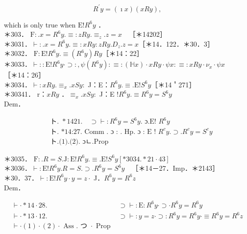 \documentclass[10pt]{article}
\begin{document}
$$
R^{\prime} y=(\imath x)(x R y),
$$

which is only true when $\mathrm{E}!R^{6} y$ ．\\
＊303． $\mathrm{F}: . x=R^{6} y . \equiv: z R y . \equiv_{z} . z=x \quad$［＊14202］\\
＊3031．$\vdash: . x=R^{6} y . \equiv: x R y: z R y . D_{z} . z=x$［＊14．122．＊30．3］\\
＊3032． $\mathrm{F}: \mathrm{E}!R^{6} y . \equiv\left(R^{6} y\right) R y$［＊14：22］\\
＊3033．$\vdash:: \mathrm{E}!R^{6} y \cdot \supset:, \psi\left(R^{6} y\right): \equiv:(\mathbb{H} x) \cdot x R y \cdot \psi x: \equiv: x R y \cdot \nu_{x} \cdot \psi x$\\
［＊14：26］\\
＊3034．$\vdash: x R y . \equiv_{x} . x S y:$ J：E：$R^{6} y . \equiv . \mathrm{E}!S^{6} y$［＊14＇271］\\
＊30341． r：$x R y$ ．$\equiv_{x} . x S y:$ J：E $!R^{6} y . \equiv R^{6} y=S^{6} y$\\
Dem．


\begin{align*}
& \text { ト. } * 1421 . \quad \supset \vdash: R^{6} y=S^{6} y . \text { ɔ.E! } R^{6} y  \tag{1}\\
& \text { ト. *14:27. Comm . ɔ : . Hp. ɔ : E ! } R^{c} y . \supset . R^{c} y=S^{c} y  \tag{2}\\
& \text { ト.(1).(2). ɔㄴ.Prop }
\end{align*}


＊3035． $\mathrm{F}: . R=S . \mathrm{J}: \mathrm{E}!R^{6} y . \equiv . \mathrm{E}!S^{6} y[* 3034 . * 21 \cdot 43]$\\
＊3036．$\vdash: \mathrm{E}!R^{6} y . R=S . \supset . R^{6} y=S^{6} y \quad$［＊14－27．Imp．＊2143］\\
＊30．37．$\vdash: \mathrm{E}!R^{6} y \cdot y=z \cdot$ J．$R^{6} y=R^{6} z$\\
Dem．

\[
\begin{array}{ll}
\vdash \cdot * 14 \cdot 28 . & \supset \vdash: \mathrm{E}: R^{6} y \cdot \supset \cdot R^{6} y=R^{6} y \\
\vdash \cdot * 13 \cdot 12 . & \supset \vdash: y=z \cdot \supset: R^{6} y=R^{6} y \cdot \equiv R^{6} y=R^{6} z  \tag{2}\\
\vdash \cdot(1) \cdot(2) \cdot \text { Ass } . \text { つ } \cdot \text { Prop }
\end{array}
\]
\end{document}
